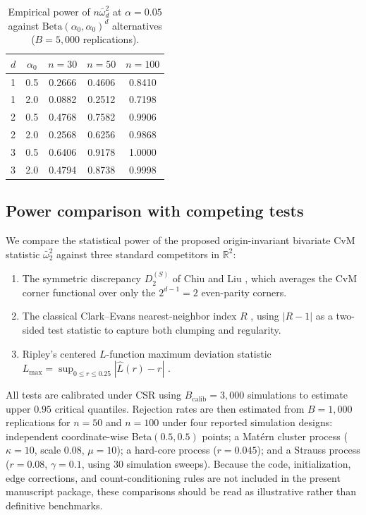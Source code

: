 \documentclass[pdflatex]{sn-jnl}
\theoremstyle{thmstyleone}
\theoremstyle{thmstyletwo}
\theoremstyle{thmstylethree}
\begin{document}
\begin{table}[htbp]
\caption{Empirical power of $n\bar\omega^2_d$ at $\alpha = 0.05$ against $\mathrm{Beta}(\alpha_0, \alpha_0)^d$ alternatives ($B = 5{,}000$ replications).}\label{tab:power-beta}
\begin{tabular*}{\textwidth}{@{\extracolsep\fill}lcccc}
\toprule
$d$ & $\alpha_0$ & $n=30$ & $n=50$ & $n=100$ \\
\midrule
1 & 0.5 & 0.2666 & 0.4606 & 0.8410 \\
1 & 2.0 & 0.0882 & 0.2512 & 0.7198 \\
2 & 0.5 & 0.4768 & 0.7582 & 0.9906 \\
2 & 2.0 & 0.2568 & 0.6256 & 0.9868 \\
3 & 0.5 & 0.6406 & 0.9178 & 1.0000 \\
3 & 2.0 & 0.4794 & 0.8738 & 0.9998 \\
\bottomrule
\end{tabular*}
\end{table}

\subsection{Power comparison with competing tests}\label{sec:power-comparison}

We compare the statistical power of the proposed origin-invariant bivariate CvM statistic $\bar\omega^2_2$ against three standard competitors in $\mathbb R^2$:
\begin{enumerate}
  \item The symmetric discrepancy $D_2^{(S)}$ of Chiu and Liu \cite{ChiuLiu2009}, which averages the CvM corner functional over only the $2^{d-1} = 2$ even-parity corners.
  \item The classical Clark--Evans nearest-neighbor index $R$ \cite{ClarkEvans1954}, using $|R - 1|$ as a two-sided test statistic to capture both clumping and regularity.
  \item Ripley's centered $L$-function maximum deviation statistic $L_{\max}=\sup_{0\le r\le0.25}|\widehat L(r)-r|$ \cite{Diggle2003}.
\end{enumerate}
All tests are calibrated under CSR using $B_{\mathrm{calib}}=3{,}000$ simulations to estimate upper $0.95$ critical quantiles. Rejection rates are then estimated from $B=1{,}000$ replications for $n=50$ and $n=100$ under four reported simulation designs: independent coordinate-wise Beta$(0.5,0.5)$ points; a Mat\'ern cluster process ($\kappa=10$, scale $0.08$, $\mu=10$); a hard-core process ($r=0.045$); and a Strauss process ($r=0.08$, $\gamma=0.1$, using 30 simulation sweeps). Because the code, initialization, edge corrections, and count-conditioning rules are not included in the present manuscript package, these comparisons should be read as illustrative rather than definitive benchmarks.
\end{document}
